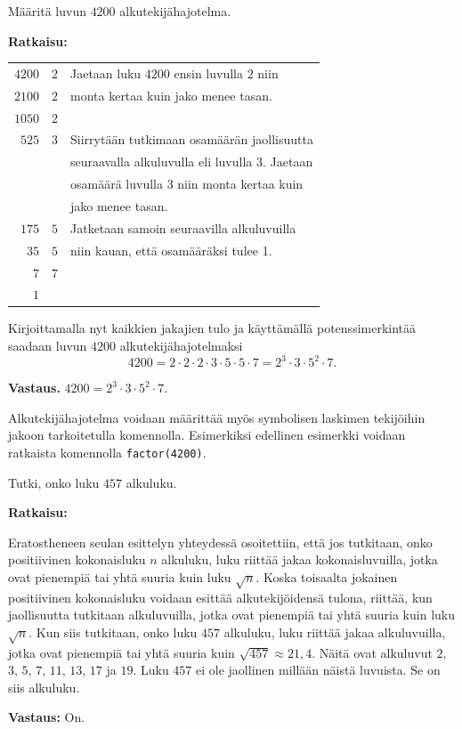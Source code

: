 \begin{esimerkki}
Määritä luvun $4200$
alkutekijähajotelma.

{\bf Ratkaisu:}

\begin{tabular}{r|ll}
$4200$ & $2$ &
Jaetaan luku $4200$ ensin luvulla $2$ niin\\
$2100$ & $2$ &
monta kertaa kuin jako menee tasan.\\
$1050$ & $2$ & \\
$525$ & $3$ &
Siirrytään tutkimaan osamäärän jaollisuutta\\
& &
seuraavalla alkuluvulla eli luvulla $3$. Jaetaan\\
& &
osamäärä luvulla $3$ niin monta kertaa kuin\\
& &
jako menee tasan.\\
$175$ & $5$ &
Jatketaan samoin seuraavilla alkuluvuilla\\
$35$ & $5$ &
niin kauan, että osamääräksi tulee 1.\\
$7$ & $7$ & \\
$1$ & & \\
\end{tabular}

Kirjoittamalla nyt kaikkien jakajien tulo ja käyttämällä
potenssimerkintää saadaan luvun $4200$
alkutekijähajotelmaksi
\[
4200 = 2 \cdot 2 \cdot 2 \cdot 3 \cdot 5 \cdot 5 \cdot 7
= 2^3 \cdot 3 \cdot 5^2 \cdot 7.
\]

{\bf Vastaus.} $4200 =2^3\cdot 3 \cdot 5^2 \cdot 7$.
\end{esimerkki}

Alkutekijähajotelma voidaan määrittää myös symbolisen laskimen tekijöihin jakoon tarkoitetulla komennolla. Esimerkiksi edellinen esimerkki voidaan ratkaista komennolla {\tt factor(4200)}.

\begin{esimerkki}
Tutki, onko luku $457$ alkuluku.

{\bf Ratkaisu:}

Eratostheneen seulan esittelyn yhteydessä osoitettiin, että
jos tutkitaan, onko positiivinen kokonaisluku $n$ alkuluku,
luku riittää jakaa kokonaisluvuilla, jotka ovat pienempiä tai
yhtä suuria kuin luku $\sqrt{n}$. Koska toisaalta jokainen
positiivinen kokonaisluku voidaan esittää alkutekijöidensä
tulona, riittää, kun jaollisuutta tutkitaan alkuluvuilla,
jotka ovat pienempiä tai yhtä suuria kuin luku $\sqrt{n}$.
Kun siis tutkitaan, onko luku $457$ alkuluku, luku riittää
jakaa alkuluvuilla, jotka ovat pienempiä tai yhtä suuria kuin
$\sqrt{457} \approx 21,4$. Näitä ovat alkuluvut $2$, $3$, $5$,
$7$, $11$, $13$, $17$ ja $19$. Luku $457$ ei ole jaollinen
millään näistä luvuista. Se on siis alkuluku.

{\bf Vastaus:} On.
\end{esimerkki}

